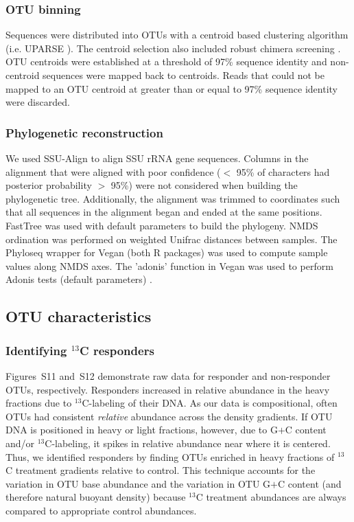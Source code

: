 \documentclass{article}
\begin{document}
\subsubsection{OTU binning} 
Sequences were distributed into OTUs with a centroid based clustering
algorithm (i.e. UPARSE \citep{edgar2013}). The centroid selection also
included robust chimera screening \citep{edgar2013}. OTU centroids were
established at a threshold of 97\% sequence identity and non-centroid
sequences were mapped back to centroids. Reads that could not be mapped to
an OTU centroid at greater than or equal to 97\% sequence identity were
discarded. 

\subsubsection{Phylogenetic reconstruction}
We used SSU-Align \citep{nawrocki2009,nawrocki2013} to align SSU rRNA gene
sequences. Columns in the alignment that were aligned with poor confidence
($<$ 95\% of characters had posterior probability $>$ 95\%) were not
considered when building the phylogenetic tree. Additionally, the
alignment was trimmed to coordinates such that all sequences in the
alignment began and ended at the same positions. FastTree
\citep{price2010} was used with default parameters to build the phylogeny.
NMDS ordination was performed on weighted Unifrac \citep{lozupone2005}
distances between samples. The Phyloseq \citep{mcmurdie2013} wrapper for
Vegan \citep{oksanen2015} (both R packages) was used to compute sample
values along NMDS axes. The 'adonis' function in Vegan was used to perform
Adonis tests (default parameters) \citep{Anderson2001a}.

\subsection{OTU characteristics}
%
\subsubsection{Identifying $^{13}$C responders} 
Figures~S11 and~S12 demonstrate raw data for responder and non-responder OTUs,
respectively. Responders increased in relative abundance in the heavy fractions
due to $^{13}$C-labeling of their DNA. As our data is compositional, often OTUs
had consistent \textit{relative} abundance across the density gradients. If OTU
DNA is positioned in heavy or light fractions, however, due to G$+$C content
and/or $^{13}$C-labeling, it spikes in relative abundance near where it is
centered. Thus, we identified responders by finding OTUs enriched in heavy
fractions of $^{13}$C treatment gradients relative to control. This technique
accounts for the variation in OTU base abundance and the variation in OTU G$+$C
content (and therefore natural buoyant density) because $^{13}$C treatment
abundances are always compared to appropriate control abundances.  
\end{document}
